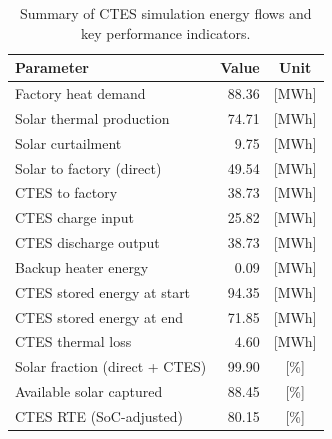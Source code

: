 \renewcommand{\arraystretch}{1.2}
\begin{table}[h]
\centering
\begin{tabular}{l|r c}
\hline
Parameter & Value & Unit \\
\hline
Factory heat demand & 88.36 & [MWh] \\
Solar thermal production & 74.71 & [MWh] \\
Solar curtailment & 9.75 & [MWh] \\
Solar to factory (direct) & 49.54 & [MWh] \\
CTES to factory & 38.73 & [MWh] \\
CTES charge input & 25.82 & [MWh] \\
CTES discharge output & 38.73 & [MWh] \\
Backup heater energy & 0.09 & [MWh] \\
CTES stored energy at start & 94.35 & [MWh] \\
CTES stored energy at end & 71.85 & [MWh] \\
CTES thermal loss & 4.60 & [MWh] \\
\hline
Solar fraction (direct + CTES) & 99.90 & [\%] \\
Available solar captured & 88.45 & [\%] \\
CTES RTE (SoC-adjusted) & 80.15 & [\%] \\
\hline
\end{tabular}
\caption{Summary of CTES simulation energy flows and key performance indicators.}
\label{tab:ctes-simulation-summary}
\end{table}
